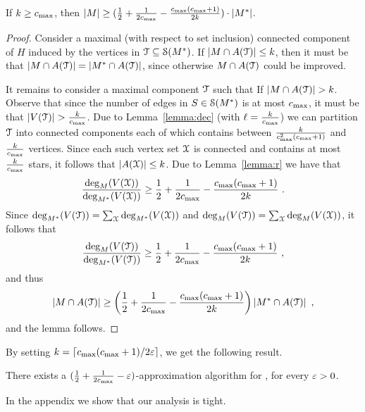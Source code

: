 \iffalse %

\begin{lemma}
Given a parameter $k$, a connected graph $G$ with a maximum degree $d$
can be decomposed into connected components of size at least $k$, and
at most $d(k-1) + 1$.
\end{lemma}

\begin{proof}
We give a constructive proof.  Start constructing a connected
component by adding adjacent vertices one by one to the component and
removing them from the graph.  If at some point, removing a vertex
disconnect the graph, add all the small components (of size less than
$k$) to the constructed component and decompose the large components
(of size at least $k$) recursively.  Note that removing a vertex can
break the graph to at most $d - 1$ additional components.
\end{proof}

\fi %


\begin{lemma}
If $k \geq c_{\max}$, then $\left| M \right| \geq (\frac{1}{2} + \frac{1}{2c_{\max}}
- \frac{c_{\max}(c_{\max}+1)}{2k}) \cdot \left| M^* \right|$.
\end{lemma}
\begin{proof}
Consider a maximal (with respect to set inclusion) connected component
of $H$ induced by the vertices in $\mathcal{T} \subseteq \mathcal{S}(M^*)$.
%
If $\left| M \cap A(\mathcal{T}) \right| \leq k$, then it must be that $\left| M \cap
A(\mathcal{T}) \right| = \left| M^* \cap A(\mathcal{T}) \right|$, since otherwise $M \cap
A(\mathcal{T})$ could be improved.

It remains to consider a maximal component $\mathcal{T}$ such that If
$\left| M \cap A(\mathcal{T}) \right| > k$.  Observe that since the number of edges
in $S \in \mathcal{S}(M^*)$ is at most $c_{\max}$, it must be that
$\left| V(\mathcal{T}) \right| > \frac{k}{c_{\max}}$.
%
Due to Lemma~\ref{lemma:dec} (with $\ell = \frac{k}{c_{\max}}$) we can
partition $\mathcal{T}$ into connected components each of which contains
between $\frac{k}{c_{\max}^2(c_{\max}+1)}$ and $\frac{k}{c_{\max}}$ vertices.
%
Since each such vertex set $\mathcal{X}$ is connected and contains at most
$\frac{k}{c_{\max}}$ stars, it follows that $\left| A(\mathcal{X}) \right| \leq k$.
%
Due to Lemma~\ref{lemma:r} we have that
\[
\frac{\deg_M(V(\mathcal{X}))}{\deg_{M^*}(V(\mathcal{X}))} 
\geq \frac{1}{2} + \frac{1}{2c_{\max}} - \frac{c_{\max}(c_{\max}+1)}{2k}
~.
\]
Since $\deg_{M^*}(V(\mathcal{T})) = \sum_{\mathcal{X}} \deg_{M^*}(V(\mathcal{X}))$ and
$\deg_M(V(\mathcal{T})) = \sum_{\mathcal{X}} \deg_M(V(\mathcal{X}))$, it follows that
\[
\frac{\deg_M(V(\mathcal{T}))}{\deg_{M^*}(V(\mathcal{T}))}
\geq \frac{1}{2} + \frac{1}{2c_{\max}} - \frac{c_{\max}(c_{\max}+1)}{2k}
~,
\]
and thus
\[
\left| M \cap A(\mathcal{T}) \right|
\geq \left(  \frac{1}{2} + \frac{1}{2c_{\max}} -
             \frac{c_{\max}(c_{\max}+1)}{2k} \right) \left| M^* \cap A(\mathcal{T}) \right|
~,
\]
and the lemma follows.
\end{proof}

By setting $k = \left\lceil c_{\max}(c_{\max}+1)/2\varepsilon \right\rceil$, we get the following
result.

\begin{corollary}
\label{cor:local}
There exists a $(\frac{1}{2} + \frac{1}{2c_{\max}} - \varepsilon)$-approximation algorithm
for \carpool, for every $\varepsilon>0$.
\end{corollary}

In the appendix we show that our analysis is tight.